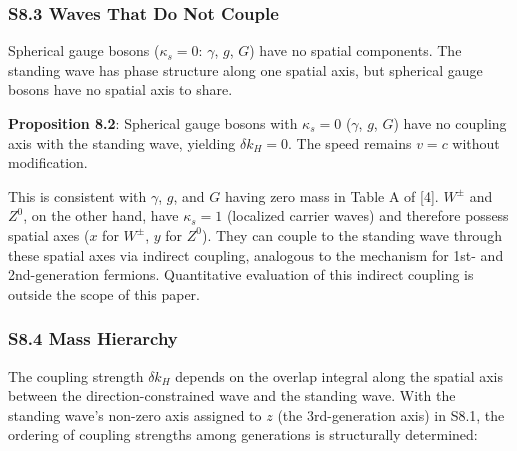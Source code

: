 \documentclass[
  a4paper,11pt]{article}
\theoremstyle{definition}
\theoremstyle{remark}
\begin{document}
\subsubsection{S8.3 Waves That Do Not
Couple}\label{s8.3-waves-that-do-not-couple}

Spherical gauge bosons (\(\kappa_s = 0\): \(\gamma\), \(g\), \(G\)) have
no spatial components. The standing wave has phase structure along one
spatial axis, but spherical gauge bosons have no spatial axis to share.

\textbf{Proposition 8.2}: Spherical gauge bosons with \(\kappa_s = 0\)
(\(\gamma\), \(g\), \(G\)) have no coupling axis with the standing wave,
yielding \(\delta k_H = 0\). The speed remains \(v = c\) without
modification.

This is consistent with \(\gamma\), \(g\), and \(G\) having zero mass in
Table A of {[}4{]}. \(W^{\pm}\) and \(Z^0\), on the other hand, have
\(\kappa_s = 1\) (localized carrier waves) and therefore possess spatial
axes (\(x\) for \(W^{\pm}\), \(y\) for \(Z^0\)). They can couple to the
standing wave through these spatial axes via indirect coupling,
analogous to the mechanism for 1st- and 2nd-generation fermions.
Quantitative evaluation of this indirect coupling is outside the scope
of this paper.

\subsubsection{S8.4 Mass Hierarchy}\label{s8.4-mass-hierarchy}

The coupling strength \(\delta k_H\) depends on the overlap integral
along the spatial axis between the direction-constrained wave and the
standing wave. With the standing wave's non-zero axis assigned to \(z\)
(the 3rd-generation axis) in S8.1, the ordering of coupling strengths
among generations is structurally determined:
\end{document}
